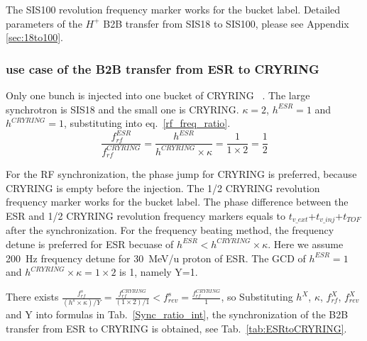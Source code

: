 The SIS100 revolution frequency marker works for the bucket label. Detailed parameters of the $H^{+}$ B2B transfer from SIS18 to SIS100, please see Appendix \ref{sec:18to100}.
\subsubsection{use case of the B2B transfer from ESR to CRYRING}
Only one bunch is injected into one bucket of CRYRING ~\cite{herfurth_low_2013, lestinsky_cryring_2015}. The large synchrotron is SIS18 and the small one is CRYRING. $\kappa=2$, $h^{ESR}=1$ and $h^{CRYRING}=1$, substituting into eq.~\ref{rf_freq_ratio}. 
\begin{equation}
\frac{f_{rf}^{ESR}}{f_{rf}^{CRYRING}}= \frac {h^{ESR}}{h^{CRYRING} \times \kappa}= \frac{1}{1 \times 2}=\frac{1}{2}
\end{equation}

For the RF synchronization, the phase jump for CRYRING is preferred, because CRYRING is empty before the injection. The 1/2 CRYRING revolution frequency marker works for the bucket label. The phase difference between the ESR and 1/2 CRYRING revolution frequency markers equals to $t_{v\_ext}$+$t_{v\_inj}$+$t_{TOF}$ after the synchronization. 
For the frequency beating method, the frequency detune is preferred for ESR becuase of $h^{ESR} < h^{CRYRING} \times \kappa$. Here we assume \SI{200}{Hz} frequency detune for \SI{30}{MeV/\atomicmassunit} proton of ESR. The GCD of $h^{ESR}=1$ and $h^{CRYRING} \times \kappa=1\times 2$ is 1, namely Y=1.

There exists $\frac{f_{rf}^{s}}{(h^s\times \kappa)/Y}=\frac{f_{rf}^{CRYRING}}{(1\times 2)/1}< f_{rev}^{s}=\frac{f_{rf}^{CRYRING}}{1}$, so Substituting $h^X$, $\kappa$, $f_{rf}^{X}$, $f_{rev}^{X}$ and Y into formulas in Tab.~\ref{Sync_ratio_int}, the synchronization of the B2B transfer from ESR to CRYRING is obtained, see Tab.~\ref{tab:ESRtoCRYRING}.

